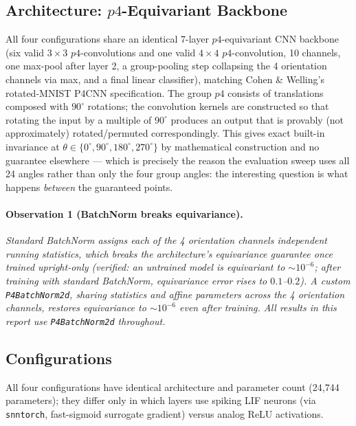 \documentclass[11pt]{article}
\begin{document}
\subsection{Architecture: $p4$-Equivariant Backbone}
\label{sec:arch}

All four configurations share an identical 7-layer $p4$-equivariant CNN backbone (six valid
$3 \times 3$ $p4$-convolutions and one valid $4 \times 4$ $p4$-convolution, 10 channels, one max-pool
after layer 2, a group-pooling step collapsing the 4 orientation channels via max, and a final linear
classifier), matching Cohen \& Welling's rotated-MNIST P4CNN specification. The group $p4$ consists
of translations composed with $90^\circ$ rotations; the convolution kernels are constructed so that
rotating the input by a multiple of $90^\circ$ produces an output that is provably (not
approximately) rotated/permuted correspondingly. This gives exact built-in invariance at
$\theta \in \{0^\circ, 90^\circ, 180^\circ, 270^\circ\}$ by mathematical construction and no
guarantee elsewhere --- which is precisely the reason the evaluation sweep uses all 24 angles rather
than only the four group angles: the interesting question is what happens \emph{between} the
guaranteed points.

\paragraph{Observation 1 (BatchNorm breaks equivariance).} \textit{Standard BatchNorm assigns each of
the 4 orientation channels independent running statistics, which breaks the architecture's
equivariance guarantee once trained upright-only (verified: an untrained model is equivariant to
$\sim 10^{-6}$; after training with standard BatchNorm, equivariance error rises to $0.1$--$0.2$). A
custom \texttt{P4BatchNorm2d}, sharing statistics and affine parameters across the 4 orientation
channels, restores equivariance to $\sim 10^{-6}$ even after training. All results in this report use
\texttt{P4BatchNorm2d} throughout.}

\subsection{Configurations}

All four configurations have identical architecture and parameter count (24,744 parameters); they
differ only in which layers use spiking LIF neurons (via \texttt{snntorch}, fast-sigmoid surrogate
gradient) versus analog ReLU activations.
\end{document}
